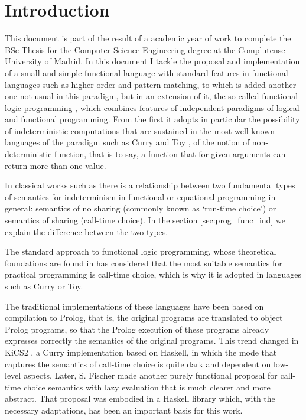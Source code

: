 \documentclass[class=article, crop=false]{standalone}
\begin{document}
\section{Introduction}

This document is part of the result of a academic year of work to complete the BSc Thesis for
the Computer Science Engineering degree at the Complutense University of Madrid. In this
document I tackle the proposal and implementation of a small and simple functional language
with standard features in functional languages such as higher order and pattern matching, to
which is added another one not usual in this paradigm, but in an extension of it, the
so-called functional logic programming \cite{antoy2010functional}, which combines features of
independent paradigms of logical and functional programming. From the first it adopts in
particular the possibility of indeterministic computations that are sustained in the most
well-known languages of the paradigm such as Curry \cite{Hanus16Curry} and Toy
\cite{fraguas1999toy}, of the notion of non-deterministic function, that is to say, a
function that for given arguments can return more than one value.

In classical works such as \cite{hussmann1993nondeterminism} there is a relationship between
two fundamental types of semantics for indeterminism in functional or equational programming
in general: semantics of no sharing (commonly known as `run-time choice') or semantics of
sharing (call-time choice). In the section \ref{sec:prog_func_ind} we explain the difference
between the two types.

The standard approach to functional logic programming, whose theoretical foundations are
found in \cite{DBLP:journals/jlp/Gonzalez-MorenoHLR99} has considered that the most suitable
semantics for practical programming is call-time choice, which is why it is adopted in
languages such as Curry or Toy.

The traditional implementations of these languages have been based on compilation to Prolog,
that is, the original programs are translated to object Prolog programs, so that the Prolog
execution of these programs already expresses correctly the semantics of the original
programs. This trend changed in KiCS2 \cite{BrasselHanusPeemoellerReck11}, a Curry
implementation based on Haskell, in which the mode that captures the semantics of call-time
choice is quite dark and dependent on low-level aspects. Later, S. Fischer made another
purely functional proposal for call-time choice semantics with lazy
evaluation \cite{fischer2011purely} that is much clearer and more abstract. That proposal was
embodied in a Haskell library which, with the necessary adaptations, has been an important
basis for this work.
\end{document}
